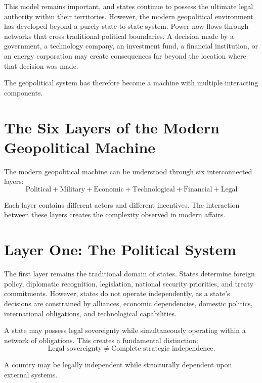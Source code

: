 \documentclass[11pt,openany]{book}
\theoremstyle{plain}
\theoremstyle{definition}
\begin{document}
This model remains important, and states continue to possess the ultimate legal authority within their territories. However, the modern geopolitical environment has developed beyond a purely state-to-state system. Power now flows through networks that cross traditional political boundaries. A decision made by a government, a technology company, an investment fund, a financial institution, or an energy corporation may create consequences far beyond the location where that decision was made.

The geopolitical system has therefore become a machine with multiple interacting components.

\section*{The Six Layers of the Modern Geopolitical Machine}

The modern geopolitical machine can be understood through six interconnected layers:
\[
\boxed{
\text{Political}
+
\text{Military}
+
\text{Economic}
+
\text{Technological}
+
\text{Financial}
+
\text{Legal}
}
\]

Each layer contains different actors and different incentives. The interaction between these layers creates the complexity observed in modern affairs.


\section*{Layer One: The Political System}

The first layer remains the traditional domain of states. States determine foreign policy, diplomatic recognition, legislation, national security priorities, and treaty commitments. However, states do not operate independently, as a state's decisions are constrained by alliances, economic dependencies, domestic politics, international obligations, and technological capabilities.

A state may possess legal sovereignty while simultaneously operating within a network of obligations. This creates a fundamental distinction:
\[
\text{Legal sovereignty}
\neq
\text{Complete strategic independence}.
\]

A country may be legally independent while structurally dependent upon external systems.

\end{document}

